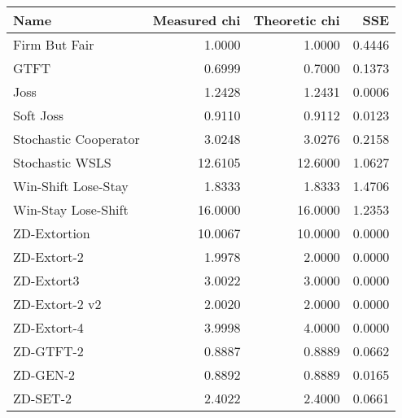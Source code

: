 \begin{tabular}{lrrr}
\toprule
                  Name &  Measured chi &  Theoretic chi &     SSE \\
\midrule
         Firm But Fair &        1.0000 &     1.0000 &  0.4446 \\
                  GTFT &        0.6999 &     0.7000 &  0.1373 \\
                  Joss &        1.2428 &     1.2431 &  0.0006 \\
             Soft Joss &        0.9110 &     0.9112 &  0.0123 \\
 Stochastic Cooperator &        3.0248 &     3.0276 &  0.2158 \\
       Stochastic WSLS &       12.6105 &    12.6000 &  1.0627 \\
   Win-Shift Lose-Stay &        1.8333 &     1.8333 &  1.4706 \\
   Win-Stay Lose-Shift &       16.0000 &    16.0000 &  1.2353 \\
          ZD-Extortion &       10.0067 &    10.0000 &  0.0000 \\
           ZD-Extort-2 &        1.9978 &     2.0000 &  0.0000 \\
            ZD-Extort3 &        3.0022 &     3.0000 &  0.0000 \\
        ZD-Extort-2 v2 &        2.0020 &     2.0000 &  0.0000 \\
           ZD-Extort-4 &        3.9998 &     4.0000 &  0.0000 \\
             ZD-GTFT-2 &        0.8887 &     0.8889 &  0.0662 \\
              ZD-GEN-2 &        0.8892 &     0.8889 &  0.0165 \\
              ZD-SET-2 &        2.4022 &     2.4000 &  0.0661 \\
\bottomrule
\end{tabular}
